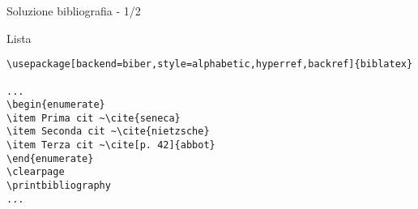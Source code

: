 \begin{frame}[fragile]{Soluzione bibliografia - 1/2}

\begin{block}{Lista}
    
\begin{lstlisting}
\usepackage[backend=biber,style=alphabetic,hyperref,backref]{biblatex}

...
\begin{enumerate}
\item Prima cit ~\cite{seneca}
\item Seconda cit ~\cite{nietzsche}
\item Terza cit ~\cite[p. 42]{abbot}
\end{enumerate}
\clearpage
\printbibliography
...
\end{lstlisting}

\end{block}

\end{frame}
